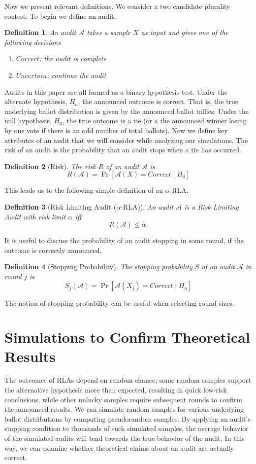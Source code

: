\documentclass{article}
\newtheorem{definition}{Definition}
\begin{document}
Now we present relevant definitions.
We consider a two candidate plurality contest.
To begin we define an audit.
\begin{definition}
An audit $\mathcal{A}$ takes a sample $X$ as input and gives one of the 
following decisions
\begin{enumerate}
\item
$Correct$: the audit is complete
\item
$Uncertain$: continue the audit
\end{enumerate}
\end{definition}
Audits in this paper are all formed as a binary hypothesis test.
Under the alternate hypothesis, $H_a$, the announced outcome is correct. 
That is, the true underlying ballot distribution is given by the announced ballot tallies.
Under the null hypothesis, $H_0$, the true outcome is a tie 
(or a the announced winner losing by one vote if there is an odd number of total ballots).
Now we define key attributes of an audit that we will consider while analyzing our simulations.
The risk of an audit is the probability that an audit stops when a tie has occurred.
\begin{definition}[Risk]
The risk $R$ of an audit $\mathcal{A}$ is
$$R(\mathcal{A})=\Pr[\mathcal{A}(X)=Correct \mid H_0]$$
\end{definition}
This leads us to the following simple definition of an $\alpha$-RLA.
\begin{definition}[Risk Limiting Audit ($\alpha$-RLA)]
An audit $\mathcal{A}$ is a Risk Limiting Audit with 
risk limit $\alpha$ iff 
$$R(\mathcal{A}) \le \alpha.$$
\end{definition}

It is useful to discuss the probability of an audit stopping in
some round, if the outcome is correctly announced.
\begin{definition}[Stopping Probability]
The stopping probability $S$ of an audit $\mathcal{A}$ in round $j$ is 
$$S_j(\mathcal{A})=\Pr[\mathcal{A}(X_j)=Correct \mid H_a]$$
\end{definition}
The notion of stopping probability can be useful when selecting round sizes.

\section{Simulations to Confirm Theoretical Results}

The outcomes of RLAs depend on random chance; some random samples
support the alternative hypothesis more than expected, resulting in 
quick low-risk conclusions, while other unlucky samples require subsequent
rounds to confirm the announced results.
We can simulate random samples for various underlying ballot 
distributions by computing pseudorandom samples. 
By applying an audit's stopping condition to thousands of such
simulated samples, the average behavior of the simulated
audits will tend towards the true behavior of the audit.
In this way, we can examine whether theoretical claims about an audit are
actually correct.
\end{document}

